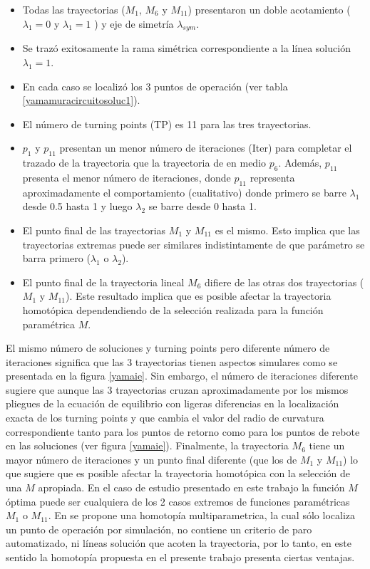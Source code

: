 \documentclass[conference,letterpaper,twocolumn]{IEEEtran}
\begin{document}
\begin{itemize}
\item Todas las trayectorias ($M_1$, $M_6$ y $M_{11}$) presentaron un doble acotamiento ($\lambda_1=0$ y $\lambda_1=1$ )  y eje de simetría $\lambda_{sym}$.
\item Se trazó exitosamente la rama simétrica correspondiente a la línea solución $\lambda_1=1$.
\item En cada caso se localizó los 3 puntos de operación (ver tabla \ref{yamamuracircuitosoluc1}).
\item El número de turning points (TP) es  11 para las tres trayectorias.
\item $p_1$ y $p_{11}$ presentan un menor número de iteraciones (Iter) para completar el trazado de la trayectoria que la
trayectoria de en medio $p_6$. Además, $p_{11}$ presenta el  menor número de iteraciones, donde $p_{11}$ representa aproximadamente
el comportamiento (cualitativo) donde primero se barre $\lambda_1$ desde 0.5 hasta 1 y luego $\lambda_2$ se barre desde 0 hasta 1.
\item El punto final de las trayectorias $M_1$ y $M_{11}$ es el mismo. Esto implica
que las trayectorias extremas puede ser similares indistintamente de que parámetro se
barra primero ($\lambda_1$ o $\lambda_2$).
\item El punto final de la trayectoria lineal $M_{6}$ difiere de las otras dos trayectorias ($M_1$ y $M_{11}$).
Este resultado implica que es posible afectar la trayectoria homot\'opica dependendiendo
de la selección realizada para la función paramétrica $M$.
\end{itemize}

El mismo número de soluciones y turning points pero diferente número de iteraciones significa que 
las 3 trayectorias tienen aspectos simulares como se presentada en la figura \ref{yamaie}. Sin embargo,
el número de iteraciones diferente sugiere que aunque las 3 trayectorias cruzan aproximadamente por los mismos pliegues de la ecuación
de equilibrio con ligeras diferencias en la localización exacta de los turning points y que cambia el valor del radio de curvatura correspondiente tanto para los puntos de retorno como para los puntos de rebote en las soluciones (ver figura \ref{yamaie}). Finalmente, la trayectoria $M_6$ tiene un mayor número de iteraciones
y un punto final diferente (que los de $M_1$ y $M_{11}$) lo que sugiere que es posible afectar
la trayectoria homotópica con la selección de una $M$ apropiada. En el caso de estudio presentado
en este trabajo la función  $M$ óptima puede ser cualquiera de los 2 casos extremos de funciones paramétricas $M_{1}$ o $M_{11}$.
En \cite{homo_MOS} se propone una homotopía multiparametrica, la cual sólo localiza un punto de operación por simulación,
no contiene un criterio de paro automatizado, ni líneas solución que acoten la trayectoria, por lo tanto,
en este sentido la homotopía propuesta en el presente trabajo presenta ciertas ventajas. 
\end{document}
